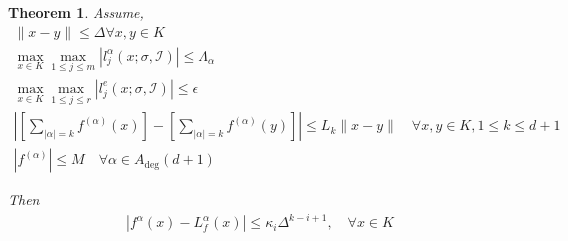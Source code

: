\documentclass{article}
\newtheorem{theorem}{Theorem}[section]
\newtheorem{definition}{Definition}[theorem]
\theoremstyle{case}
\newcommand{\naturals}{\mathbb N}
\newcommand{\natsn}{\naturals^n}
\newcommand{\Rn}{\mathbb R^n}
\newcommand{\Adeg}{{A_{\textrm{deg}}}}
\newcommand{\bidx}{{\mathcal I}}
\begin{document}


\begin{theorem}
Assume,
\begin{align}
\|x - y\| \le \Delta \forall x, y \in K \\
\max_{x\in K}\max_{1 \le j \le m} |l_j^{\alpha}(x; \sigma, \bidx)| \le \Lambda_{\alpha} \label{max_lagrange} \\
\max_{x\in K}\max_{1 \le j \le r} |l_j^e(x; \sigma, \bidx)| \le \epsilon \label{small_pivots} \\
\left |\left[  \sum_{|\alpha| = k} f^{(\alpha)}(x)\right] - \left[\sum_{|\alpha| = k} f^{(\alpha)}(y) \right]\right| \le L_k \|x - y\| \quad  \forall x, y \in K, 1 \le k \le d + 1 \label{lipschitz_derivatives} \\
|f^{(\alpha)}| \le M \quad \forall \alpha \in \Adeg(d+1)
\end{align}

Then
\begin{align*}
\left| f^{\alpha}(x) - L_f^{\alpha}(x) \right| \le \kappa_i \Delta^{k - i + 1},
\quad \forall x \in K
\end{align*}
\end{theorem}
\end{document}
